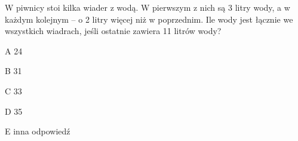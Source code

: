 \begin{tresc}
W piwnicy stoi kilka wiader z wodą. W pierwszym z nich są 3 litry wody, a w każdym kolejnym – o 2 litry więcej niż w poprzednim. Ile wody jest łącznie we wszystkich wiadrach, jeśli ostatnie zawiera 11 litrów wody?
\end{tresc}
\begin{wariant}{A} 24 \end{wariant}
\begin{wariant}{B} 31 \end{wariant}
\begin{wariant}{C} 33 \end{wariant}
\begin{wariant}{D} 35 \end{wariant}
\begin{wariant}{E} inna odpowiedź \end{wariant}
